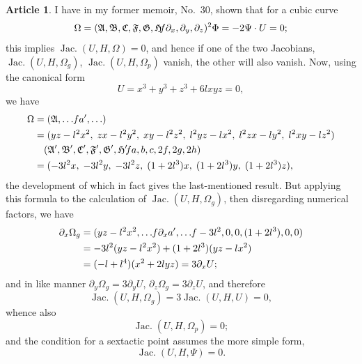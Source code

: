 \documentclass[12pt,a4paper]{article}
\theoremstyle{definition}
\newtheorem{art}{Article}[section]
\DeclareMathOperator{\Jac}{Jac.}
\begin{document}
\begin{art}
I have in my former memoir, No.~30, shown that for a cubic curve
\[
\Omega = (\mathfrak{A}, \mathfrak{B}, \mathfrak{C}, \mathfrak{F}, \mathfrak{G}, \mathfrak{H} \hspace{-2pt} f\partial_x, \partial_y, \partial_z)^2 \Phi = -2\Psi \cdot U = 0;
\]
this implies $\Jac(U, H, \Omega) = 0$, and hence if one of the two Jacobians, $\Jac(U, H, \Omega_g)$, $\Jac(U, H, \Omega_p)$ vanish, the other will also vanish. Now, using the canonical form
\[
U = x^3 + y^3 + z^3 + 6lxyz = 0,
\]
we have
\begin{align*}
\Omega &= (\mathfrak{A}, \ldots \hspace{-2pt} fa', \ldots) \\
&= (yz - l^2x^2, \; zx - l^2y^2, \; xy - l^2z^2, \; l^2yz - lx^2, \; l^2zx - ly^2, \; l^2xy - lz^2) \\
&\quad (\mathfrak{A}', \mathfrak{B}', \mathfrak{C}', \mathfrak{F}', \mathfrak{G}', \mathfrak{H}' \hspace{-2pt} fa, b, c, 2f, 2g, 2h) \\
&= (-3l^2x, \; -3l^2y, \; -3l^2z, \; (1 + 2l^3)x, \; (1 + 2l^3)y, \; (1 + 2l^3)z),
\end{align*}
the development of which in fact gives the last-mentioned result. But applying this formula to the calculation of $\Jac(U, H, \Omega_g)$, then disregarding numerical factors, we have
\begin{align*}
\partial_x\Omega_g &= (yz - l^2x^2, \ldots \hspace{-2pt} f\partial_xa', \ldots \hspace{-2pt} f-3l^2, 0, 0, (1 + 2l^3), 0, 0) \\
&= -3l^2(yz - l^2x^2) + (1 + 2l^3)(yz - lx^2) \\
&= (-l + l^4)(x^2 + 2lyz) = 3\partial_x U;
\end{align*}
and in like manner $\partial_y\Omega_g = 3\partial_y U$, $\partial_z\Omega_g = 3\partial_z U$, and therefore
\[
\Jac(U, H, \Omega_g) = 3\Jac(U, H, U) = 0,
\]
whence also
\[
\Jac(U, H, \Omega_p) = 0;
\]
and the condition for a sextactic point assumes the more simple form,
\[
\Jac(U, H, \Psi) = 0.
\]
\end{art}
\end{document}
